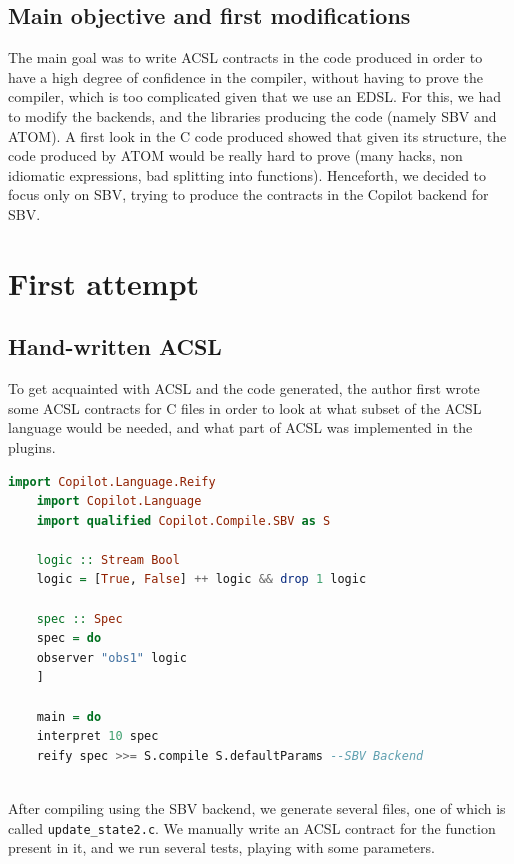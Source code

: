 \documentclass[a4paper,11pt,final]{article}
\begin{document}
	\subsection{Main objective and first modifications}
	The main goal was to write ACSL contracts in the code produced in order to have a high degree of confidence in the compiler, without having to prove the compiler, which is too complicated given that we use an EDSL. For this, we had to modify the backends, and the libraries producing the code (namely SBV and ATOM). A first look in the C code produced showed that given its structure, the code produced by ATOM would be really hard to prove (many hacks, non idiomatic expressions, bad splitting into functions). Henceforth, we decided to focus only on SBV, trying to produce the contracts in the Copilot backend for SBV.
	
	\section{First attempt}
	\subsection{Hand-written ACSL}
	
	To get acquainted with ACSL and the code generated, the author first wrote some ACSL contracts for C files in order to look at what subset of the ACSL language would be needed, and what part of ACSL was implemented in the plugins.
	
	\begin{lstlisting}[language=Haskell]
	import Copilot.Language.Reify
	import Copilot.Language
	import qualified Copilot.Compile.SBV as S
	
	logic :: Stream Bool
	logic = [True, False] ++ logic && drop 1 logic
	
	spec :: Spec
	spec = do
	observer "obs1" logic
	]
	
	main = do
	interpret 10 spec
	reify spec >>= S.compile S.defaultParams --SBV Backend
	
	\end{lstlisting}
	
	After compiling using the SBV backend, we generate several files, one of which is called \texttt{update\_state2.c}. We manually write an ACSL contract for the function present in it, and we run several tests, playing with some parameters.
	
\end{document}
